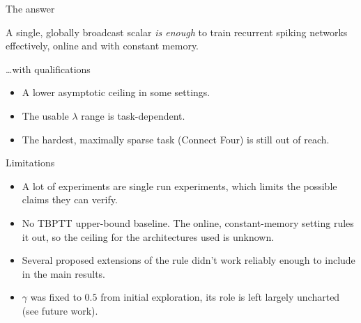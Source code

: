 \documentclass[aspectratio=169,11pt]{beamer}
\begin{document}
\begin{frame}{The answer}
  \begin{block}{}
    \centering\large
    A single, globally broadcast scalar \emph{is enough} to train recurrent
    spiking networks effectively, online and with constant memory.
  \end{block}
  \vfill
  \begin{alertblock}{\ldots with qualifications}
    \begin{itemize}
      \item A lower asymptotic ceiling in some settings.
      \item The usable $\lambda$ range is task-dependent.
      \item The hardest, maximally sparse task (Connect Four) is still out of
            reach.
    \end{itemize}
  \end{alertblock}
\end{frame}

\begin{frame}{Limitations}
  \begin{itemize}
    \item A lot of experiments are single run experiments, which limits the possible           claims they can verify.
    \item No TBPTT upper-bound baseline. The online, constant-memory
          setting rules it out, so the ceiling for the architectures used is unknown.
    \item Several proposed extensions of the rule didn't work reliably enough to
          include in the main results.
    \item $\gamma$ was fixed to $0.5$ from initial exploration, its role is
          left largely uncharted (see future work).
  \end{itemize}
\end{frame}
\end{document}
